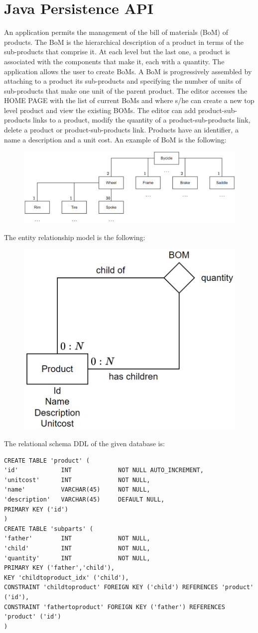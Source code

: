 \section{Java Persistence API}
An application permits the management of the bill of materials (BoM) of products. The BoM is the hierarchical description of a product in terms of the 
sub-products that comprise it. At each level but the last one, a product is associated with the components that make it, each with a quantity. The application 
allows the user to create BoMs. A BoM is progressively assembled by attaching to a product its sub-products and specifying the number of units of sub-products 
that make one unit of the parent product. The editor accesses the HOME PAGE with the list of current BoMs and where s/he can create a new top level product and 
view the existing BOMs. The editor can add product-sub-products links to a product, modify the quantity of a product-sub-products link, delete a product or
product-sub-products link. Products have an identifier, a name a description and a unit cost. An example of BoM is the following: 
\begin{figure}[H]
    \centering
    \includegraphics[width=0.6\linewidth]{images/BoM.png}
\end{figure}
The entity relationship model is the following:
\begin{figure}[H]
    \centering
    \includegraphics[width=0.3\linewidth]{images/e-r1.png}
\end{figure}
The relational schema DDL of the given database is: 
\begin{lstlisting}[style=SQL]
CREATE TABLE 'product' (
'id'            INT             NOT NULL AUTO_INCREMENT,
'unitcost'      INT             NOT NULL,
'name'          VARCHAR(45)     NOT NULL,
'description'   VARCHAR(45)     DEFAULT NULL,
PRIMARY KEY ('id')
) 
CREATE TABLE 'subparts' (
'father'        INT             NOT NULL,
'child'         INT             NOT NULL,
'quantity'      INT             NOT NULL,
PRIMARY KEY ('father','child'),
KEY 'childtoproduct_idx' ('child'),
CONSTRAINT 'childtoproduct' FOREIGN KEY ('child') REFERENCES 'product' ('id'),
CONSTRAINT 'fathertoproduct' FOREIGN KEY ('father') REFERENCES 'product' ('id')
)           
\end{lstlisting}
